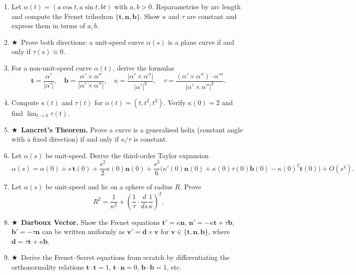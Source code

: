 \documentclass[11pt, a4paper]{article}
\newcommand{\mbf}[1]{\mathbf{#1}}
\newcommand{\kp}{\kappa}
\newcommand{\tp}{\tau}
\newcommand{\hard}{$\bigstar$\ }
\begin{document}
\begin{enumerate}[label=\textbf{Q\arabic*.}, leftmargin=*, itemsep=6pt]

\item Let $\alpha(t)=(a\cos t, a\sin t, bt)$ with $a,b>0$. Reparametrise by arc length and compute the Frenet trihedron $\{\mbf{t},\mbf{n},\mbf{b}\}$. Show $\kp$ and $\tp$ are constant and express them in terms of $a,b$.

\item \hard Prove both directions: a unit-speed curve $\alpha(s)$ is a plane curve if and only if $\tp(s)\equiv 0$.

\item For a non-unit-speed curve $\alpha(t)$, derive the formulas
\[
  \mbf{t}=\frac{\alpha'}{|\alpha'|},\quad \mbf{b}=\frac{\alpha'\times\alpha''}{|\alpha'\times\alpha''|},\quad \kp=\frac{|\alpha'\times\alpha''|}{|\alpha'|^3}, \quad \tp = \frac{(\alpha'\times\alpha'')\cdot\alpha'''}{|\alpha'\times\alpha''|^2}.
\]

\item Compute $\kp(t)$ and $\tp(t)$ for $\alpha(t)=(t,t^2,t^3)$. Verify $\kp(0)=2$ and find $\lim_{t\to 0}\tp(t)$.

\item \hard \textbf{Lancret's Theorem.} Prove a curve is a generalised helix (constant angle with a fixed direction) if and only if $\kp/\tp$ is constant.

\item Let $\alpha(s)$ be unit-speed. Derive the third-order Taylor expansion
\[
  \alpha(s)=\alpha(0)+s\,\mbf{t}(0)+\frac{s^2}{2}\kp(0)\mbf{n}(0)+\frac{s^3}{6}\bigl(\kp'(0)\mbf{n}(0)+\kp(0)\tp(0)\mbf{b}(0)-\kp(0)^2\mbf{t}(0)\bigr)+O(s^4).
\]

\item Let $\alpha(s)$ be unit-speed and lie on a sphere of radius $R$. Prove
\[
  R^2=\frac{1}{\kp^2}+\left(\frac{1}{\tp}\cdot\frac{d}{ds}\frac{1}{\kp}\right)^2.
\]

\item \hard \textbf{Darboux Vector.} Show the Frenet equations $\mbf{t}'=\kp\mbf{n}$, $\mbf{n}'=-\kp\mbf{t}+\tp\mbf{b}$, $\mbf{b}'=-\tp\mbf{n}$ can be written uniformly as $\mbf{v}'=\mbf{d}\times\mbf{v}$ for $\mbf{v}\in\{\mbf{t},\mbf{n},\mbf{b}\}$, where $\mbf{d}=\tp\mbf{t}+\kp\mbf{b}$.

\item \hard Derive the Frenet--Serret equations from scratch by differentiating the orthonormality relations $\mbf{t}\cdot\mbf{t}=1$, $\mbf{t}\cdot\mbf{n}=0$, $\mbf{b}\cdot\mbf{b}=1$, etc.


\end{enumerate}
\end{document}
